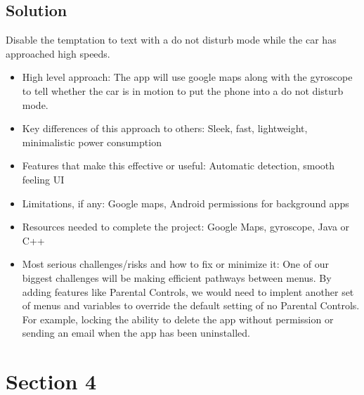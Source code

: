 \documentclass[12pt]{article}
\begin{document}
	\subsection{Solution}
	 Disable the temptation to text with a do not disturb mode while the car has approached high speeds.\\
	\begin{itemize}
	\item High level approach: The app will use google maps along with the gyroscope to tell whether the car is in motion to put the phone into a do not disturb mode.
	\item Key differences of this approach to others:  Sleek, fast, lightweight, minimalistic power consumption
	\item Features that make this effective or useful: Automatic detection, smooth feeling UI
	\item Limitations, if any: Google maps, Android permissions for background apps
	\item Resources needed to complete the project: Google Maps, gyroscope, Java or C++
	\item Most serious challenges/risks and how to fix or minimize it:  One of our biggest challenges will be making efficient pathways between menus.  By adding features like Parental Controls, we would need to implent another set of menus and variables to override the default setting of no Parental Controls. For example, locking the ability to delete the app without permission or sending an email when the app has been uninstalled. \\
\end{itemize}
\section{Section 4}
\end{document}
